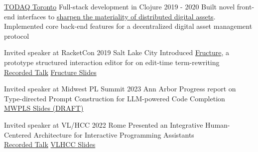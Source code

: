 \documentclass[10pt,a4paper]{article}
\begin{document}

  \headedsubsection
    {\href{http://todaqfinance.net/}{TODAQ Toronto} \sbull Full-stack development in Clojure}
    {2019 - 2020}
    {Built novel front-end interfaces to  \href{https://andrewblinn.com/portfolio/todaq/}{sharpen the materiality of distributed digital assets}.\\Implemented core back-end features for a decentralized digital asset management protocol}


  \headedsubsection
    {Invited speaker at RacketCon}
    {2019 \sbull Salt Lake City}
    {Introduced \href{https://github.com/disconcision/fructure}{Fructure}, a prototype structured interaction editor for on edit-time term-rewriting \\
    \sbull \href{https://www.youtube.com/watch?v=CnbVCNIh1NA}{Recorded Talk}
    \sbull \href{https://github.com/disconcision/fructure/blob/master/screenshots/REAL-RacketCon-Fructure-Talk.pdf}{Fructure Slides}}

  \headedsubsection
    {Invited speaker at Midwest PL Summit}
    {2023 \sbull Ann Arbor}
    {Progress report on Type-directed Prompt Construction for LLM-powered Code Completion \\
    \sbull \href{http://andrewblinn.com/papers/DRAFT-Type-directed-Prompt-Construction-for-LLM-powered-Programming-Assistants}{MWPLS Slides (DRAFT)}}
    
  \headedsubsection
    {Invited speaker at VL/HCC}
    {2022 \sbull Rome}
    {Presented an Integrative Human-Centered Architecture for Interactive Programming Assistants \\
    \sbull \href{https://www.youtube.com/watch?v=G_9Yyut3ckw}{Recorded Talk}
    \sbull \href{https://docs.google.com/presentation/d/1lrclRzlx-ayd_iqOENyvCtnexBgTpkaSltPmgQQi_IE/edit?usp=sharing}{VLHCC Slides}}
    
\end{document}
